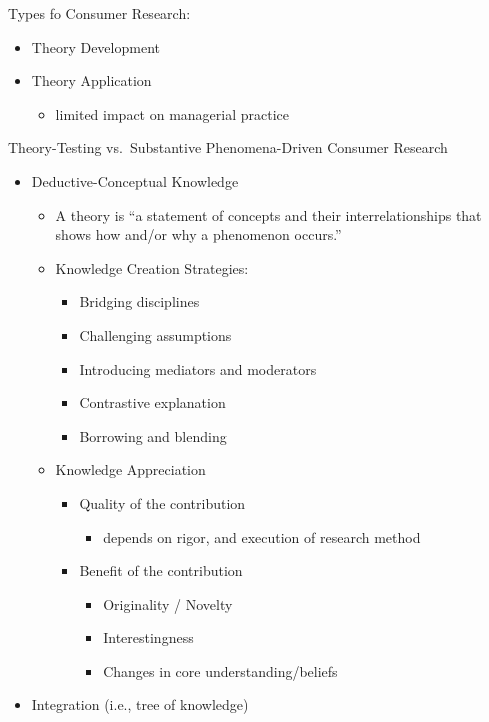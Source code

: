 \documentclass[
]{book}
\providecommand{\tightlist}{%
  \setlength{\itemsep}{0pt}\setlength{\parskip}{0pt}}
\begin{document}
Types fo Consumer Research:

\begin{itemize}
\item
  Theory Development
\item
  Theory Application

  \begin{itemize}
  \tightlist
  \item
    limited impact on managerial practice
  \end{itemize}
\end{itemize}

Theory-Testing vs.~Substantive Phenomena-Driven Consumer Research

\citep{janiszewski2016}

\begin{itemize}
\item
  Deductive-Conceptual Knowledge

  \begin{itemize}
  \item
    A theory is ``a statement of concepts and their interrelationships that shows how and/or why a phenomenon occurs.'' \citep{corley2011}
  \item
    Knowledge Creation Strategies:

    \begin{itemize}
    \item
      Bridging disciplines
    \item
      Challenging assumptions
    \item
      Introducing mediators and moderators
    \item
      Contrastive explanation
    \item
      Borrowing and blending
    \end{itemize}
  \item
    Knowledge Appreciation

    \begin{itemize}
    \item
      Quality of the contribution

      \begin{itemize}
      \tightlist
      \item
        depends on rigor, and execution of research method
      \end{itemize}
    \item
      Benefit of the contribution

      \begin{itemize}
      \item
        Originality / Novelty
      \item
        Interestingness
      \item
        Changes in core understanding/beliefs
      \end{itemize}
    \end{itemize}
  \end{itemize}
\item
  Integration (i.e., tree of knowledge)
\end{itemize}
\end{document}
